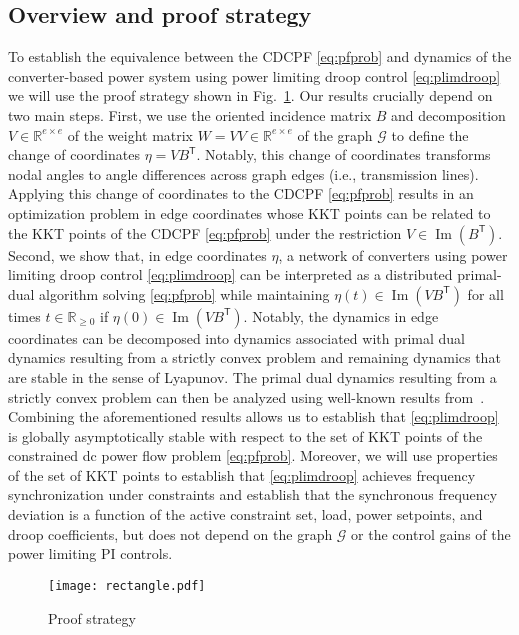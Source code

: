 \documentclass[twocolumn,twoside,journal]{IEEEtran}
\DeclareMathOperator{\Ima}{Im}
\newcommand{\mc}{\mathcal}
\begin{document}
\subsection{Overview and proof strategy}
To establish the equivalence between the CDCPF \eqref{eq:pfprob} and dynamics of the converter-based power system using power limiting droop control \eqref{eq:plimdroop} we will use the proof strategy shown in Fig.~\ref{fig:strategy}. Our results crucially depend on two main steps. First, we use the oriented incidence matrix $B$ and decomposition $V\in\mathbb{R}^{e \times e}$ of the weight matrix $W=VV \in\mathbb{R}^{e \times e}$ of the graph $\mc G$ to define the change of coordinates $\eta = VB^\mathsf{T}$. Notably, this change of coordinates transforms nodal angles to angle differences across graph edges (i.e., transmission lines). Applying this change of coordinates to the CDCPF \eqref{eq:pfprob} results in an optimization problem in edge coordinates whose KKT points can be related to the KKT points of the CDCPF \eqref{eq:pfprob} under the restriction $V \in \Ima(B^\mathsf{T})$. Second, we show that, in edge coordinates $\eta$, a network of converters using power limiting droop control \eqref{eq:plimdroop} can be interpreted as a distributed primal-dual algorithm solving \eqref{eq:pfprob} while maintaining $\eta(t) \in \Ima (VB^\mathsf{T})$ for all times $t \in \mathbb{R}_{\geq 0}$ if $\eta(0) \in \Ima (VB^\mathsf{T})$. Notably, the dynamics in edge coordinates can be decomposed into dynamics associated with primal dual dynamics resulting from a strictly convex problem and remaining dynamics that are stable in the sense of Lyapunov. The primal dual dynamics resulting from a strictly convex problem can then be analyzed using well-known results from~\cite{ashish}. Combining the aforementioned results allows us to establish that \eqref{eq:plimdroop} is globally asymptotically stable with respect to the set of KKT points of the constrained dc power flow problem \eqref{eq:pfprob}. Moreover, we will use properties of the set of KKT points to establish that \eqref{eq:plimdroop} achieves frequency synchronization under constraints and establish that the synchronous frequency deviation is a function of the active constraint set, load, power setpoints, and droop coefficients, but does not depend on the graph $\mc G$ or the control gains of the power limiting PI controls.
%
\begin{figure}[htbp]
    \begin{center}
        \texttt{[image: rectangle.pdf]}
        \caption{Proof strategy\label{fig:strategy}}
    \end{center}
\end{figure}
\end{document}
